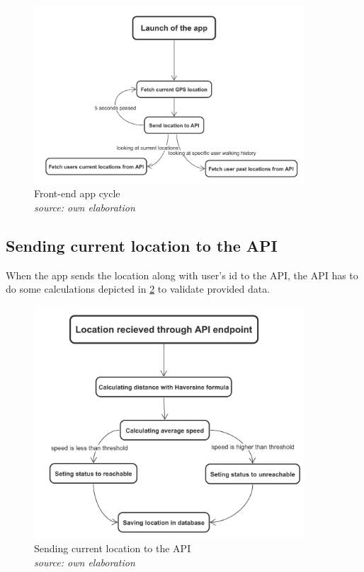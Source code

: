 \begin{figure}[p]
    \includegraphics[width=0.9\textwidth]{images/front.png}
    \caption{Front-end app cycle \\ \textit{source: own elaboration}}
    \label{fig:front}
\end{figure}

\subsection{Sending current location to the API}
When the app sends the location along with user's id to the API, the API has to do some calculations depicted in \ref{fig:api} to validate provided data.

\begin{figure}[H]
    \includegraphics[width=0.9\textwidth]{images/api.png}
    \caption{Sending current location to the API \\ \textit{source: own elaboration}}
    \label{fig:api}
\end{figure}

